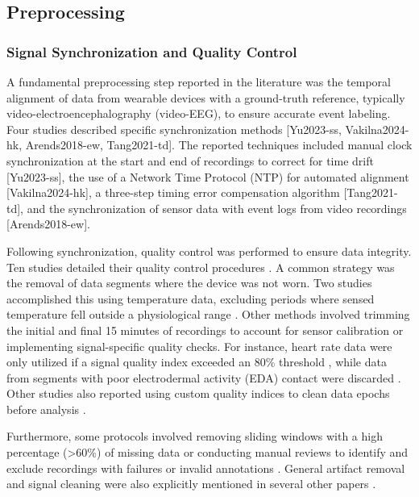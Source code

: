 \subsection{Preprocessing}

\subsubsection{Signal Synchronization and Quality Control}
A fundamental preprocessing step reported in the literature was the temporal alignment of data from wearable devices with a ground-truth reference, typically video-electroencephalography (video-EEG), to ensure accurate event labeling. Four studies described specific synchronization methods [Yu2023-ss, Vakilna2024-hk, Arends2018-ew, Tang2021-td]. The reported techniques included manual clock synchronization at the start and end of recordings to correct for time drift [Yu2023-ss], the use of a Network Time Protocol (NTP) for automated alignment [Vakilna2024-hk], a three-step timing error compensation algorithm [Tang2021-td], and the synchronization of sensor data with event logs from video recordings [Arends2018-ew].

Following synchronization, quality control was performed to ensure data integrity. Ten studies detailed their quality control procedures \cite{Yu2023-ss, Li2022-ty, Arends2018-ew, Jiang2022-zu, Wang2025-my, Nasseri2021-xn, Tang2021-td, Ali2020-ke, Ge2023-ab, Hegarty-Craver2021-hk}. A common strategy was the removal of data segments where the device was not worn. Two studies accomplished this using temperature data, excluding periods where sensed temperature fell outside a physiological range \cite{Yu2023-ss, Tang2021-td}. Other methods involved trimming the initial and final 15 minutes of recordings to account for sensor calibration \cite{Yu2023-ss} or implementing signal-specific quality checks. For instance, heart rate data were only utilized if a signal quality index exceeded an 80\% threshold \cite{Arends2018-ew}, while data from segments with poor electrodermal activity (EDA) contact were discarded \cite{Li2022-ty}. Other studies also reported using custom quality indices to clean data epochs before analysis \cite{Nasseri2021-xn, Wang2025-my}.

Furthermore, some protocols involved removing sliding windows with a high percentage (>60\%) of missing data \cite{Jiang2022-zu} or conducting manual reviews to identify and exclude recordings with failures or invalid annotations \cite{Yu2023-ss}. General artifact removal and signal cleaning were also explicitly mentioned in several other papers \cite{Ge2023-ab, Hegarty-Craver2021-hk, Ali2020-ke}.


